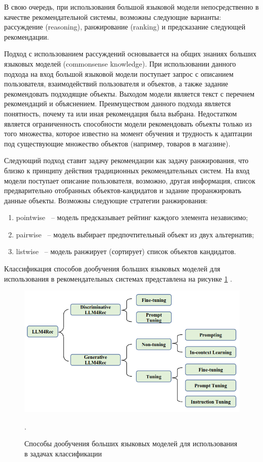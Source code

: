 В свою очередь, при использования большой языковой модели непосредственно в качестве рекомендательной системы, возможны следующие варианты: рассуждение (reasoning), ранжирование (ranking) и предсказание следующей рекомендации.

Подход с использованием рассуждений основывается на общих знаниях больших языковых моделей (commonsense knowledge). При использовании данного подхода на вход большой языковой модели поступает запрос с описанием пользователя, взаимодействий пользователя и объектов, а также задание рекомендовать подходящие объекты. Выходом модели является текст с перечнем рекомендаций и объяснением. Преимуществом данного подхода является понятность, почему та или иная рекомендация была выбрана. Недостатком является ограниченность способности модели рекомендовать объекты только из того множества, которое известно на момент обучения и трудность к адаптации под существующие множество объектов (например, товаров в магазине).

Следующий подход ставит задачу рекомендации как задачу ранжирования, что близко к принципу действия традиционных рекомендательных систем. На вход модели поступает описание пользователя, возможно, другая информация, список предварительно отобранных объектов-кандидатов и задание проранжировать данные объекты. Возможны следующие стратегии ранжирования:
\begin{enumerate}
    \item pointwise ~-- модель предсказывает рейтинг каждого элемента независимо;
    \item pairwise ~-- модель выбирает предпочтительный объект из двух альтернатив;
    \item listwise ~-- модель ранжирует (сортирует) список объектов кандидатов.
\end{enumerate}

Классификация способов дообучения больших языковых моделей для использования в рекомендательных системах представлена на рисунке \ref{img:llm_rs_classification} \cite{llm_rs_survey}.

\begin{figure}[h]
    \centering
    \includegraphics[width=\linewidth]{../images/llm_rs_classification.png}
    \caption{Способы дообучения больших языковых моделей для использования в задачах классификации \cite{llm_rs_survey}}.
    \label{img:llm_rs_classification}
\end{figure}

